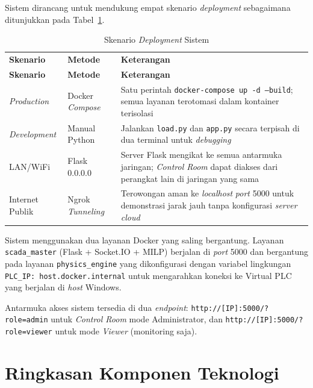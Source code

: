 Sistem dirancang untuk mendukung empat skenario \textit{deployment} sebagaimana ditunjukkan pada Tabel~\ref{tab:deployment}.

\begin{longtable}{|p{3.2cm}|p{3.0cm}|p{7.0cm}|}
    \caption{Skenario \textit{Deployment} Sistem}
    \label{tab:deployment}
    \vspace{-0.75em}\\
    \hline
    \textbf{Skenario} & \textbf{Metode} & \textbf{Keterangan} \\ \hline
    \endfirsthead
    \hline
    \textbf{Skenario} & \textbf{Metode} & \textbf{Keterangan} \\ \hline
    \endhead
    \textit{Production}     & Docker \textit{Compose}  &
        Satu perintah \texttt{docker-compose up -d --build}; semua layanan terotomasi dalam kontainer terisolasi \\ \hline
    \textit{Development}    & Manual Python   &
        Jalankan \texttt{load.py} dan \texttt{app.py} secara terpisah di dua terminal untuk \textit{debugging} \\ \hline
    LAN/WiFi       & Flask 0.0.0.0   &
        Server Flask mengikat ke semua antarmuka jaringan; \textit{Control Room} dapat diakses dari perangkat lain di jaringan yang sama \\ \hline
    Internet Publik & Ngrok \textit{Tunneling} &
        Terowongan aman ke \textit{localhost} \textit{port} 5000 untuk demonstrasi jarak jauh tanpa konfigurasi \textit{server cloud} \\ \hline
\end{longtable}

Sistem menggunakan dua layanan Docker yang saling bergantung. Layanan \texttt{scada\_master} (Flask + Socket.IO + MILP) berjalan di \textit{port} 5000 dan bergantung pada layanan \texttt{physics\_engine} yang dikonfigurasi dengan variabel lingkungan \texttt{PLC\_IP: host.docker.internal} untuk mengarahkan koneksi ke Virtual PLC yang berjalan di \textit{host} Windows.

Antarmuka akses sistem tersedia di dua \textit{endpoint}: \texttt{http://[IP]:5000/?role=admin} untuk \textit{Control Room} mode Administrator, dan \texttt{http://[IP]:5000/?role=viewer} untuk mode \textit{Viewer} (monitoring saja).

\section{Ringkasan Komponen Teknologi}
\label{sec:Ringkasan_Teknologi}

